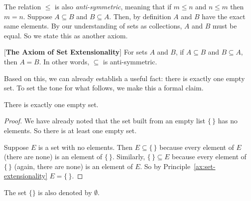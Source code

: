 The relation $\leq$ is also \emph{anti-symmetric}, meaning that if $m\leq n$ and $n\leq m$ then $m=n$. 
Suppose $A\subseteq B$ and $B\subseteq A$. Then, by definition $A$ and $B$ have the exact same elements.  By our understanding of sets as collections,
$A$ and $B$ must be equal. So we state this as another axiom.

\begin{principle}\label{ax:set-extensionality}
[\textbf{The Axiom of Set Extensionality}]
For sets $A$ and $B$, if $A\subseteq B$ and $B\subseteq A$, then $A=B$. In other words, $\subseteq$ is anti-symmetric.
\end{principle}

Based on this, we can already establish a useful fact: there is exactly one empty set. To set the tone for what follows, we make this a formal claim.

\begin{lemma}
	There is exactly one empty set.
\begin{proof}
	We have already noted that the set built from an empty list $\{\,\}$ has no elements. So there is at least one empty set.
	
	Suppose $E$ is a set with no elements.
	Then $E\subseteq \{\,\}$ because every element of $E$ (there are none) is an element of $\{\,\}$. 
	Similarly, $\{\,\}\subseteq E$ because every element of $\{\,\}$ (again, there are none) is an element of $E$. 
	So by Principle~\ref{ax:set-extensionality} $E = \{\,\}$.
\end{proof}
\end{lemma}

\begin{defn}
  The set $\{\}$ is also denoted by $\emptyset$.
\end{defn}

